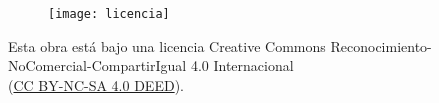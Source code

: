 \documentclass[a4paper,12pt,twoside]{memoir}
\begin{document}
\clearpage

\tableofcontents

\clearpage

\listoffigures

\clearpage

\listoftables
\clearpage

\mainmatter












\newpage\null\thispagestyle{empty}

\newenvironment{bottompar}{\par\vspace*{\fill}}{\clearpage}

\begin{bottompar}
\begin{figure}[H]
	\centering
	\texttt{[image: licencia]}
\end{figure}

\begin{center}
Esta obra está bajo una licencia Creative Commons Reconocimiento-NoComercial-CompartirIgual 4.0 Internacional\\
(\href{https://creativecommons.org/licenses/by-nc-sa/4.0/?ref=chooser-v1}{CC BY-NC-SA 4.0 DEED}).
\end{center}
\end{bottompar}
\end{document}
